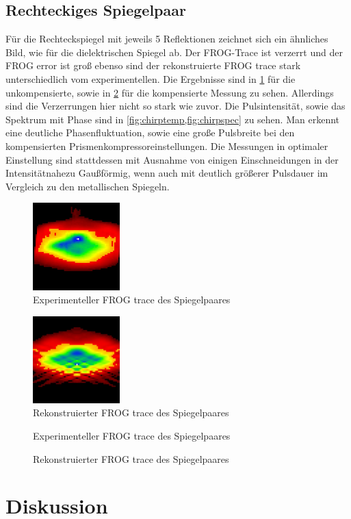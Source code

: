 \documentclass[twoside,        %
               BCOR12mm,       %
               english,ngerman, %
               fleqn,headsepline=false,footsepline=false
              ]{Vorlage/MFPREPORT}
\begin{document}
\subsection{Rechteckiges Spiegelpaar}
Für die Rechteckspiegel mit jeweils 5 Reflektionen zeichnet sich ein ähnliches
Bild, wie für die dielektrischen Spiegel ab. Der FROG-Trace ist verzerrt
und der FROG error ist groß ebenso sind der rekonstruierte FROG trace stark
unterschiedlich vom experimentellen. Die Ergebnisse sind in \cref{fig:chirpspiegel1}
für die unkompensierte, sowie in \cref{fig:chirpspiegel2} für die kompensierte
Messung zu sehen. Allerdings sind die Verzerrungen hier nicht so stark wie
zuvor. Die Pulsintensität, sowie das Spektrum mit Phase sind in
\cref{fig:chirptemp,fig:chirpspec} zu sehen. Man erkennt eine deutliche
Phasenfluktuation, sowie eine große Pulsbreite bei den kompensierten
Prismenkompressoreinstellungen. Die Messungen in optimaler Einstellung sind
stattdessen mit Ausnahme von einigen Einschneidungen in der Intensitätnahezu
Gaußförmig, wenn auch mit deutlich größerer Pulsdauer im Vergleich zu den 
metallischen Spiegeln.


\begin{figure}[]
    \centering
    \includegraphics[width=0.3\textwidth]{chirpsp1.jpg}
    \caption{Experimenteller FROG trace des Spiegelpaares}
    \label{fig:chirpspiegel1}
\end{figure}
\begin{figure}[]
    \centering
    \includegraphics[width=0.3\textwidth]{chirpsp2.jpg}
    \caption{Rekonstruierter FROG trace des Spiegelpaares}
    \label{fig:chirpspiegel2}
\end{figure}
\begin{figure}[]
    \centering
    
    \caption{Experimenteller FROG trace des Spiegelpaares}
    \label{fig:chirptemp}
\end{figure}
\begin{figure}[]
    \centering
    
    \caption{Rekonstruierter FROG trace des Spiegelpaares}
    \label{fig:chirpspec}
\end{figure}

\section{Diskussion}
\cite{tidecks1990current}



\end{document}
